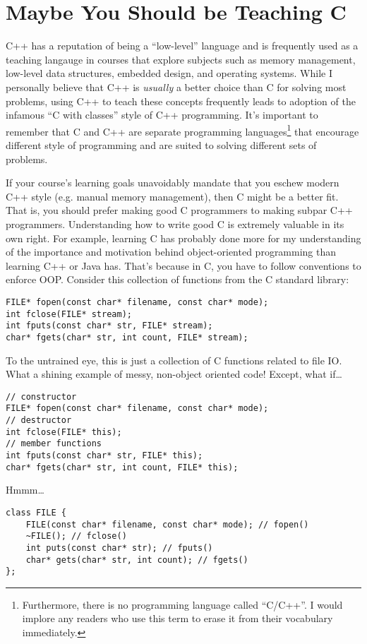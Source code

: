 \documentclass{article}
\begin{document}
\section*{Maybe You Should be Teaching C}
C++ has a reputation of being a ``low-level'' language and is frequently used as a teaching langauge in courses that explore subjects such as memory management, low-level data structures, embedded design, and operating systems.  While I personally believe that C++ is \emph{usually} a better choice than C for solving most problems, using C++ to teach these concepts frequently leads to adoption of the infamous ``C with classes'' style of C++ programming.  It's important to remember that C and C++ are separate programming languages\footnote{Furthermore, there is no programming language called ``C/C++''.  I would implore any readers who use this term to erase it from their vocabulary immediately.} that encourage different style of programming and are suited to solving different sets of problems.

If your course's learning goals unavoidably mandate that you eschew modern C++ style (e.g. manual memory management), then C might be a better fit.  That is, you should prefer making good C programmers to making subpar C++ programmers.  Understanding how to write good C is extremely valuable in its own right.  For example, learning C has probably done more for my understanding of the importance and motivation behind object-oriented programming than learning C++ or Java has.  That's because in C, you have to follow conventions to enforce OOP.  Consider this collection of functions from the C standard library:
\begin{lstlisting}
FILE* fopen(const char* filename, const char* mode);
int fclose(FILE* stream);
int fputs(const char* str, FILE* stream);
char* fgets(char* str, int count, FILE* stream);
\end{lstlisting}

To the untrained eye, this is just a collection of C functions related to file IO.  What a shining example of messy, non-object oriented code!  Except, what if\ldots
\begin{lstlisting}
// constructor 
FILE* fopen(const char* filename, const char* mode);
// destructor
int fclose(FILE* this);
// member functions
int fputs(const char* str, FILE* this);
char* fgets(char* str, int count, FILE* this);
\end{lstlisting}
Hmmm\ldots
\begin{lstlisting}
class FILE {
	FILE(const char* filename, const char* mode); // fopen()
	~FILE(); // fclose()
	int puts(const char* str); // fputs()
	char* gets(char* str, int count); // fgets()
};
\end{lstlisting}
\end{document}
